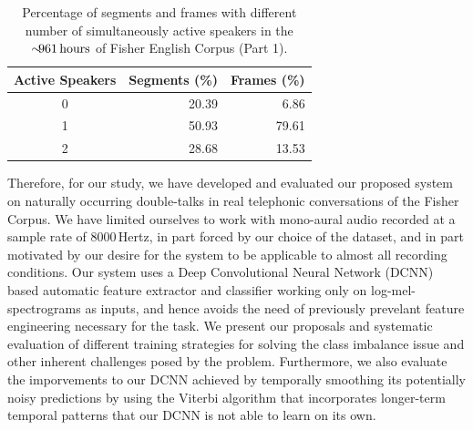 \documentclass[a4paper]{article}
\begin{document}
\begin{table}[t] \label{tbl:actspk-perc}
  \caption{Percentage of segments and frames with different number of simultaneously active speakers in the $\sim \!\!\! \text{961\,hours}$ of Fisher English Corpus (Part 1).}
  \centering
  \begin{tabular}{crr}
    \toprule
    \textbf{Active Speakers}  & \textbf{Segments (\%)}  & \textbf{Frames (\%)}  \\ \midrule
    0                         & 20.39                   &  6.86                 \\
    1                         & 50.93                   & 79.61                 \\
    2                         & 28.68                   & 13.53                 \\
    \bottomrule
  \end{tabular}
  \vspace*{-\baselineskip}
\end{table}

Therefore, for our study, we have developed and evaluated our proposed system on naturally occurring double-talks in real telephonic conversations of the Fisher Corpus.  %
We have limited ourselves to work with mono-aural audio recorded at a sample rate of 8000\,Hertz,
in part forced by our choice of the dataset,
and in part motivated by our desire for the system to be applicable to almost all recording conditions.
Our system uses a Deep Convolutional Neural Network (DCNN) based automatic feature extractor and classifier working only on log-mel-spectrograms as inputs,
and hence avoids the need of previously prevelant feature engineering necessary for the task.
We present our proposals and systematic evaluation of different training strategies for solving the class imbalance issue and other inherent challenges posed by the problem.
Furthermore, we also evaluate the imporvements to our DCNN achieved by temporally smoothing its potentially noisy predictions
by using the Viterbi algorithm that incorporates longer-term temporal patterns that our DCNN is not able to learn on its own.

\end{document}
